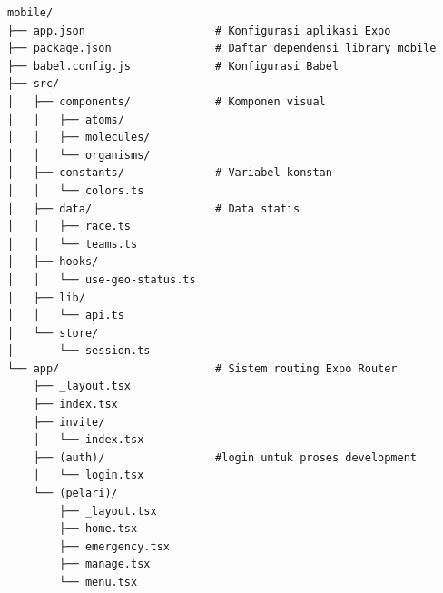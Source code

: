 \begin{lstlisting}[language={},caption={Struktur Direktori Aplikasi Mobile ITB Ultra-Marathon},label={lst:struktur-mobile}]
mobile/
├── app.json                    # Konfigurasi aplikasi Expo
├── package.json                # Daftar dependensi library mobile
├── babel.config.js             # Konfigurasi Babel
├── src/
│   ├── components/             # Komponen visual
│   │   ├── atoms/
│   │   ├── molecules/
│   │   └── organisms/
│   ├── constants/              # Variabel konstan
│   │   └── colors.ts
│   ├── data/                   # Data statis
│   │   ├── race.ts
│   │   └── teams.ts
│   ├── hooks/
│   │   └── use-geo-status.ts
│   ├── lib/
│   │   └── api.ts
│   └── store/
│       └── session.ts
└── app/                        # Sistem routing Expo Router
    ├── _layout.tsx
    ├── index.tsx
    ├── invite/
    │   └── index.tsx
    ├── (auth)/                 #login untuk proses development
    │   └── login.tsx
    └── (pelari)/
        ├── _layout.tsx
        ├── home.tsx
        ├── emergency.tsx
        ├── manage.tsx
        └── menu.tsx
\end{lstlisting}